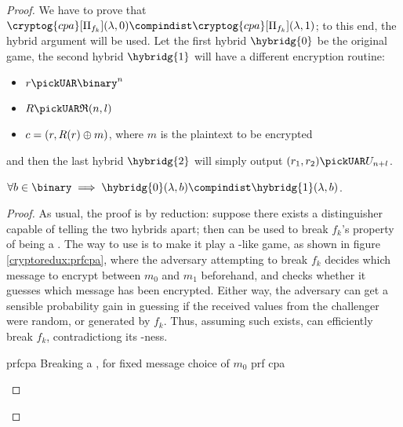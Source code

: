 \begin{proof}
    We have to prove that $\cryptog{cpa}[\Pi_{f_k}](\lambda, 0) \compindist \cryptog{cpa}[\Pi_{f_k}](\lambda, 1)$; to this end, the hybrid argument will be used. Let the first hybrid $\hybridg{0}$ be the original game, the second hybrid $\hybridg{1}$ will have a different encryption routine:

    \begin{itemize}
        \item $r \pickUAR \binary^n$
        \item $R \pickUAR \mathfrak{R}(n, l)$
        \item $c = (r, R(r) \oplus m)$, where $m$ is the plaintext to be encrypted
    \end{itemize}

    and then the last hybrid $\hybridg{2}$ will simply output $(r_1, r_2) \pickUAR U_{n + l}$.

    \begin{lemma}
        $\forall b \in \binary \implies \hybridg{0}(\lambda, b) \compindist \hybridg{1}(\lambda, b)$.
    \end{lemma}

    \begin{proof}
        As usual, the proof is by reduction: suppose there exists a distinguisher \distinguisher{} capable of telling the two hybrids apart; then \distinguisher{} can be used to break $f_k$'s property of being a \prf. The way to use \distinguisher{} is to make it play a \cpa-like game, as shown in figure \ref{cryptoredux:prfcpa}\footnotemark, where the adversary attempting to break $f_k$ decides which message to encrypt between $m_0$ and $m_1$ beforehand, and checks whether it guesses which message has been encrypted. Either way, the adversary can get a sensible probability gain in guessing if the received values from the challenger were random, or generated by $f_k$. Thus, assuming such \distinguisher{} exists, \adversary{} can efficiently break $f_k$, contradictiong its \prf-ness.



        \begin{cryptoredux}
            {prfcpa}
            {Breaking a \prf, for fixed message choice of $m_0$}
            {prf}
            {cpa}


\end{cryptoredux}
\end{proof}
\end{proof}
